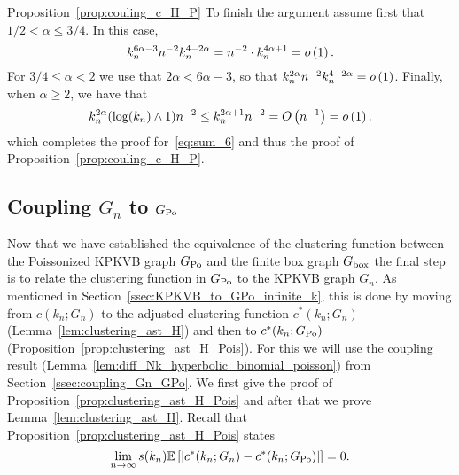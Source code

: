 \begin{proofof}{Proposition~\ref{prop:couling_c_H_P}}
To finish the argument assume first that $1/2 <\alpha \leq 3/4$. In this case,
\[
	k_n^{6\alpha -3}  n^{-2} k_n^{4 - 2\alpha} = 
	n^{-2} \cdot k_n^{4\alpha +1} = o\left(1\right).
\]
For $3/4 \le \alpha < 2$ we use that $2\alpha < 6\alpha - 3$, so that $k_n^{2\alpha} n^{-2} k_n^{4 - 2\alpha} = o\left(1\right)$. Finally, when $\alpha \geq 2$, we have that
\[
	k_n^{2\alpha} (\log(k_n) \wedge 1) n^{-2} \le k_n^{2\alpha + 1} n^{-2} = O\left(n^{-1}\right) = o\left(1\right).
\] 
which completes the proof for~\eqref{eq:sum_6} and thus the proof of Proposition~\ref{prop:couling_c_H_P}.
\end{proofof}

\subsection{Coupling \texorpdfstring{$G_n$}{Gn} to \texorpdfstring{$G_{{\mathrm{Po}}}$}{G Po}}\label{ssec:coupling_H_HP}

Now that we have established the equivalence of the clustering function between the Poissonized KPKVB graph $G_{{\mathrm{Po}}}$ and the finite box graph $G_{\mathrm{box}}$ the final step is to relate the clustering function in $G_{{\mathrm{Po}}}$ to the KPKVB graph $G_n$. As mentioned in Section~\ref{ssec:KPKVB_to_GPo_infinite_k}, this is done by moving from $c(k_n; G_n)$ to the adjusted clustering function $c^\ast(k_n; G_n)$ (Lemma~\ref{lem:clustering_ast_H}) and then to $c^\ast(k_n; G_{{\mathrm{Po}}})$ (Proposition~\ref{prop:clustering_ast_H_Pois}). For this we will use the coupling result (Lemma~\ref{lem:diff_Nk_hyperbolic_binomial_poisson}) from Section~\ref{ssec:coupling_Gn_GPo}. We first give the proof of Proposition~\ref{prop:clustering_ast_H_Pois} and after that we prove Lemma~\ref{lem:clustering_ast_H}. Recall that Proposition~\ref{prop:clustering_ast_H_Pois} states
\[
	\lim_{n \to \infty} s(k_n)\mathbb{E}\left[\left|c^\ast(k_n; G_n) - c^\ast(k_n; G_{{\mathrm{Po}}})\right|\right] = 0.
\]


